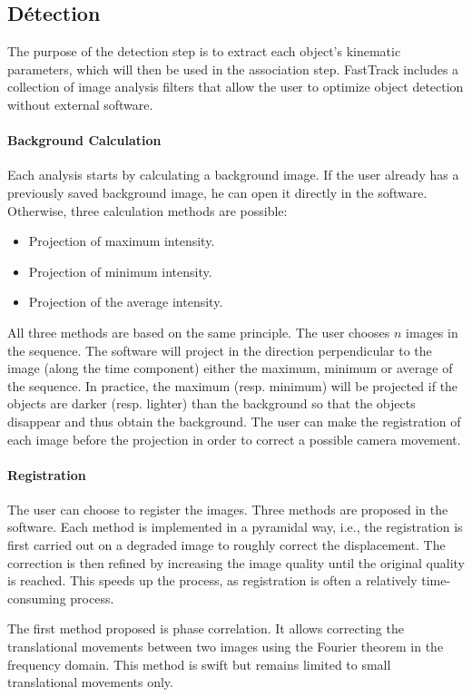 	
		\subsection{Détection}
		The purpose of the detection step is to extract each object's kinematic parameters, which will then be used in the association step. FastTrack includes a collection of image analysis filters that allow the user to optimize object detection without external software.
		\paragraph{Background Calculation}
		Each analysis starts by calculating a background image. If the user already has a previously saved background image, he can open it directly in the software. Otherwise, three calculation methods are possible:
		\begin{itemize}
			\item Projection of maximum intensity.
			\item Projection of minimum intensity.
			\item Projection of the average intensity.
		\end{itemize}
		All three methods are based on the same principle. The user chooses $n$ images in the sequence. The software will project in the direction perpendicular to the image (along the time component) either the maximum, minimum or average of the sequence. In practice, the maximum (resp. minimum) will be projected if the objects are darker (resp. lighter) than the background so that the objects disappear and thus obtain the background. The user can make the registration of each image before the projection in order to correct a possible camera movement.
		
		\paragraph{Registration}
		The user can choose to register the images. Three methods are proposed in the software. Each method is implemented in a pyramidal way, i.e., the registration is first carried out on a degraded image to roughly correct the displacement. The correction is then refined by increasing the image quality until the original quality is reached. This speeds up the process, as registration is often a relatively time-consuming process.


		The first method proposed is phase correlation. It allows correcting the translational movements between two images using the Fourier theorem in the frequency domain. This method is swift but remains limited to small translational movements only.


